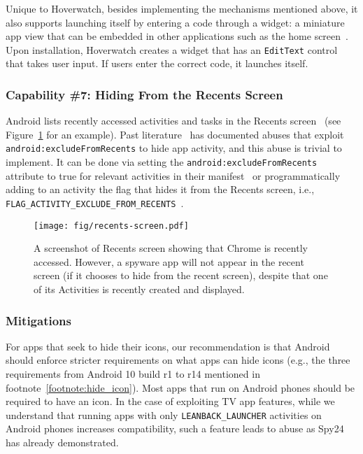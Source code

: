 Unique to Hoverwatch, besides implementing the mechanisms mentioned above, it also supports launching itself by entering a
code through a widget: a miniature app view that can be embedded in other
applications such as the home screen~\cite{Appwidge49:online}. Upon installation,
Hoverwatch creates a widget that has an \texttt{EditText} control that takes user input. If users
enter the correct code, it launches itself.



\subsubsection*{Capability \#7: Hiding From the Recents Screen}

Android lists recently accessed activities and tasks in the Recents
screen~\cite{Recentss9:online} (see Figure~\ref{fig:recents_screen} for an
example). Past literature~\cite{shan2018self, zhou2020demystifying} has
documented abuses that exploit \texttt{android:excludeFromRecents}
to hide app activity, and this abuse is trivial to implement. It can be done via
setting the \texttt{android:excludeFromRecents} attribute to true for relevant
activities in their manifest~\cite{activity72:online} or programmatically adding to an
activity
the flag that hides it from the Recents screen, i.e.,
\texttt{FLAG\_ACTIVITY\_EXCLUDE\_FROM\_RECENTS}~\cite{IntentAn90:online}.

\begin{figure}[t]
\centering
\texttt{[image: fig/recents-screen.pdf]}
\caption[Recent Apps Screen Example]{A screenshot of Recents screen showing that Chrome is recently accessed. However, a spyware app will not appear in the recent screen (if it chooses to hide from the recent screen), despite that one of its Activities is recently created and displayed.}
\label{fig:recents_screen}
\end{figure}


\subsubsection{Mitigations}
For apps that seek to hide their icons, our recommendation is that Android should enforce stricter requirements on what apps can hide icons (e.g., the three requirements from Android 10 build r1 to r14 mentioned in footnote~\ref{footnote:hide_icon}).
Most apps that run on Android phones should be required to have an icon. In the case of exploiting TV app features, while we
understand that running apps with only \texttt{LEANBACK\_LAUNCHER} activities on
Android phones increases compatibility, such a feature leads to abuse as Spy24
has already demonstrated.

